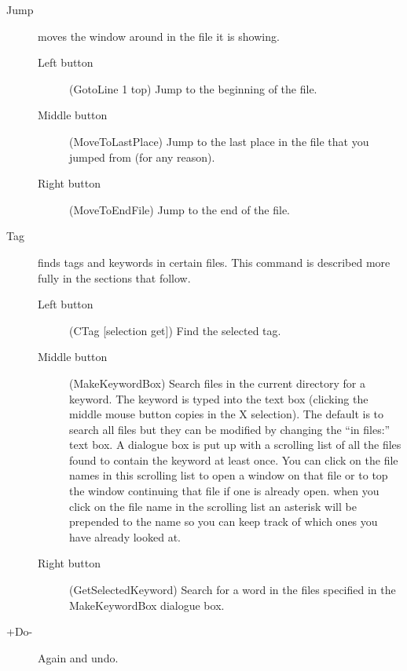 \begin{description}
\item[Jump] moves the window around in the file it is showing.

	\begin{description}

	\item[Left button] (GotoLine 1 top) Jump to the beginning
		of the file.

	\item[Middle button] (MoveToLastPlace) Jump to the last place
		in the file that you jumped from (for any reason).

	\item[Right button] (MoveToEndFile) Jump to the end of the file.

	\end{description}

\item[Tag] finds tags and keywords in certain files.
	This command is described more fully in the sections that follow.

	\begin{description}

	\item[Left button] (CTag [selection get]) Find the selected tag.

	\item[Middle button] (MakeKeywordBox)
		Search files in the current directory for a keyword.
		The keyword is typed into the text box (clicking the
		middle mouse button copies in the X selection).
		The default is to search all files but they can be
		modified by changing the ``in files:'' text box.
		A dialogue box is put up with a scrolling list of all
		the files found to contain the keyword at least once.
		You can click on the file names in this scrolling
		list to open a window on that file or to top the window
		continuing that file if one is already open.
		when you click on the file name in the scrolling list
		an asterisk will be prepended to the name so you can
		keep track of which ones you have already looked at.

	\item[Right button] (GetSelectedKeyword)
		Search for a word in the files specified in the
		MakeKeywordBox dialogue box.

	\end{description}

\item[+Do-] Again and undo.

	\begin{description}


\end{description}
\end{description}
